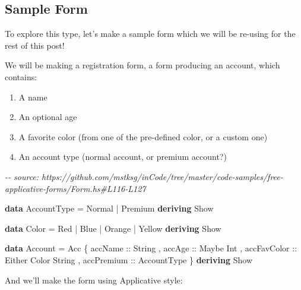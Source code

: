 \documentclass[]{article}
\newenvironment{Shaded}{}{}
\newcommand{\CommentTok}[1]{\textcolor[rgb]{0.38,0.63,0.69}{\textit{#1}}}
\newcommand{\DataTypeTok}[1]{\textcolor[rgb]{0.56,0.13,0.00}{#1}}
\newcommand{\KeywordTok}[1]{\textcolor[rgb]{0.00,0.44,0.13}{\textbf{#1}}}
\newcommand{\NormalTok}[1]{#1}
\newcommand{\OperatorTok}[1]{\textcolor[rgb]{0.40,0.40,0.40}{#1}}
\newcommand{\OtherTok}[1]{\textcolor[rgb]{0.00,0.44,0.13}{#1}}
\begin{document}
\subsection{Sample Form}\label{sample-form}

To explore this type, let's make a sample form which we will be re-using for the
rest of this post!

We will be making a registration form, a form producing an account, which
contains:

\begin{enumerate}
\def\labelenumi{\arabic{enumi}.}
\tightlist
\item
  A name
\item
  An optional age
\item
  A favorite color (from one of the pre-defined color, or a custom one)
\item
  An account type (normal account, or premium account?)
\end{enumerate}

\begin{Shaded}
\begin{Highlighting}[]
\CommentTok{{-}{-} source: https://github.com/mstksg/inCode/tree/master/code{-}samples/free{-}applicative{-}forms/Form.hs\#L116{-}L127}

\KeywordTok{data} \DataTypeTok{AccountType} \OtherTok{=} \DataTypeTok{Normal} \OperatorTok{|} \DataTypeTok{Premium}
    \KeywordTok{deriving} \DataTypeTok{Show}

\KeywordTok{data} \DataTypeTok{Color} \OtherTok{=} \DataTypeTok{Red} \OperatorTok{|} \DataTypeTok{Blue} \OperatorTok{|} \DataTypeTok{Orange} \OperatorTok{|} \DataTypeTok{Yellow}
    \KeywordTok{deriving} \DataTypeTok{Show}

\KeywordTok{data} \DataTypeTok{Account} \OtherTok{=} \DataTypeTok{Acc}\NormalTok{ \{}\OtherTok{ accName     ::} \DataTypeTok{String}
\NormalTok{                   ,}\OtherTok{ accAge      ::} \DataTypeTok{Maybe} \DataTypeTok{Int}
\NormalTok{                   ,}\OtherTok{ accFavColor ::} \DataTypeTok{Either} \DataTypeTok{Color} \DataTypeTok{String}
\NormalTok{                   ,}\OtherTok{ accPremium  ::} \DataTypeTok{AccountType}
\NormalTok{                   \}}
    \KeywordTok{deriving} \DataTypeTok{Show}
\end{Highlighting}
\end{Shaded}

And we'll make the form using Applicative style:
\end{document}
